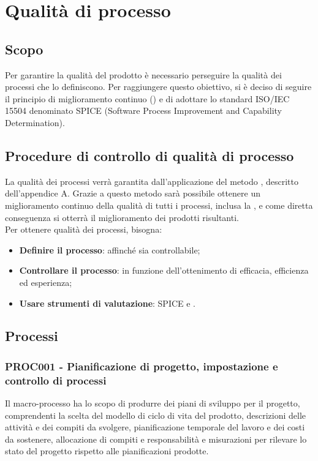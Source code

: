 \documentclass[PianoDiQualifica.tex]{subfiles}
\begin{document}
\chapter{Qualità di processo}

\section{Scopo} 
Per garantire la qualità del prodotto è necessario perseguire la qualità dei processi che lo definiscono.
Per raggiungere questo obiettivo, si è deciso di seguire il principio di miglioramento continuo () e di adottare lo standard ISO/IEC 15504 denominato SPICE (Software Process Improvement and Capability Determination).

\section{Procedure di controllo di qualità di processo}
La qualità dei processi verrà garantita dall'applicazione del metodo , descritto dell'appendice A. Grazie a questo metodo sarà possibile ottenere un miglioramento continuo della qualità di tutti i processi, inclusa la , e come diretta conseguenza si otterrà il miglioramento dei prodotti risultanti.\\Per ottenere qualità dei processi, bisogna:
\begin{itemize}
	\item \textbf{Definire il processo}: affinché sia controllabile;
	\item \textbf{Controllare il processo}: in funzione dell'ottenimento di efficacia, efficienza ed esperienza;
	\item \textbf{Usare strumenti di valutazione}: SPICE e .
\end{itemize}

\section{Processi}

\subsection{PROC001 - Pianificazione di progetto, impostazione e controllo di processi}
Il macro-processo ha lo scopo di produrre dei piani di sviluppo per il progetto, comprendenti la scelta del modello di ciclo di vita del prodotto, descrizioni delle attività e dei compiti da svolgere, pianificazione temporale del lavoro e dei costi da sostenere, allocazione di compiti e responsabilità e misurazioni per rilevare lo stato del progetto rispetto alle pianificazioni prodotte.
\end{document}
